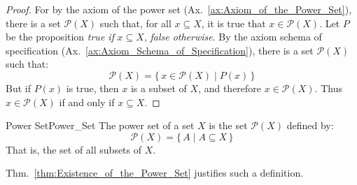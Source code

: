         \begin{proof}
            For by the axiom of the power set
            (Ax.~\ref{ax:Axiom_of_the_Power_Set}), there is a set
            $\mathscr{P}(X)$ such that, for all $x\subseteq{X}$, it is true
            that $x\in\mathscr{P}(X)$. Let $P$ be the proposition
            \textit{true if} $x\subseteq{X}$, \textit{false otherwise}. By the
            axiom schema of specification
            (Ax.~\ref{ax:Axiom_Schema_of_Specification}), there is a set
            $\mathcal{P}(X)$ such that:
            \begin{equation}
                \mathcal{P}(X)=\{\,x\in\mathscr{P}(X)\;|\;P(x)\,\}
            \end{equation}
            But if $P(x)$ is true, then $x$ is a subset of $X$, and therefore
            $x\in\mathscr{P}(X)$. Thus $x\in\mathcal{P}(X)$ if and only if
            $x\subseteq{X}$.
        \end{proof}
        \begin{fdefinition}{Power Set}{Power_Set}
            The power set of a set $X$ is the set $\mathcal{P}(X)$ defined by:
            \begin{equation}
                \mathcal{P}(X)=\{\,A\;|\;A\subseteq{X}\,\}
            \end{equation}
            That is, the set of all subsets of $X$.
        \end{fdefinition}
        Thm.~\ref{thm:Existence_of_the_Power_Set} justifies such a definition.
